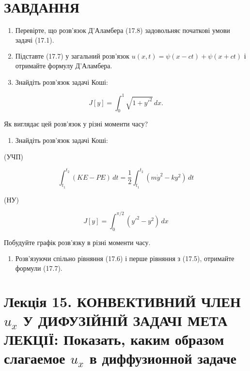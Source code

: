 \documentclass[
  ukrainian,
]{article}
\providecommand{\tightlist}{%
  \setlength{\itemsep}{0pt}\setlength{\parskip}{0pt}}
\begin{document}
\section{ЗАВДАННЯ}\label{ux437ux430ux432ux434ux430ux43dux43dux44f-11}

\begin{enumerate}
\def\labelenumi{\arabic{enumi}.}
\item
  Перевірте, що розв'язок Д'Аламбера (17.8) задовольняє початкові умови
  задачі (17.1).
\item
  Підставте (17.7) у загальний розв'язок
  \(u(x, t) = \psi(x - ct) + \psi(x + ct)\) і отримайте формулу
  Д'Аламбера.
\item
  Знайдіть розв'язок задачі Коші:
\end{enumerate}

\[
J[y] = \int_{0}^{1} \sqrt{1 + y'^{2}}\,dx.
\]

Як виглядає цей розв'язок у різні моменти часу?

\begin{enumerate}
\def\labelenumi{\arabic{enumi}.}
\setcounter{enumi}{3}
\tightlist
\item
  Знайдіть розв'язок задачі Коші:
\end{enumerate}

(УЧП)

\[
\int_{t_{1}}^{t_{2}} (KE - PE)\,dt = \frac{1}{2} \int_{t_{1}}^{t_{2}} (m\dot{y}^{2} - ky^{2})\,dt
\]

(НУ)

\[
J[y] = \int_{0}^{\pi/2} (y'^{2} - y^{2})\,dx
\]

Побудуйте графік розв'язку в різні моменти часу.

\begin{enumerate}
\def\labelenumi{\arabic{enumi}.}
\setcounter{enumi}{4}
\tightlist
\item
  Розв'язуючи спільно рівняння (17.6) і перше рівняння з (17.5),
  отримайте формули (17.7).
\end{enumerate}

\section{\texorpdfstring{Лекція 15. КОНВЕКТИВНИЙ ЧЛЕН \(u_x\) У
ДИФУЗІЙНІЙ ЗАДАЧІ МЕТА ЛЕКЦІЇ: Показать, каким образом слагаемое \(u_x\)
в диффузионной
задаче}{Лекція 15. КОНВЕКТИВНИЙ ЧЛЕН u\_x У ДИФУЗІЙНІЙ ЗАДАЧІ МЕТА ЛЕКЦІЇ: Показать, каким образом слагаемое u\_x в диффузионной задаче}}\label{ux43bux435ux43aux446ux456ux44f-15.-ux43aux43eux43dux432ux435ux43aux442ux438ux432ux43dux438ux439-ux447ux43bux435ux43d-u_x-ux443-ux434ux438ux444ux443ux437ux456ux439ux43dux456ux439-ux437ux430ux434ux430ux447ux456-ux43cux435ux442ux430-ux43bux435ux43aux446ux456ux457-ux43fux43eux43aux430ux437ux430ux442ux44c-ux43aux430ux43aux438ux43c-ux43eux431ux440ux430ux437ux43eux43c-ux441ux43bux430ux433ux430ux435ux43cux43eux435-u_x-ux432-ux434ux438ux444ux444ux443ux437ux438ux43eux43dux43dux43eux439-ux437ux430ux434ux430ux447ux435}
\end{document}
